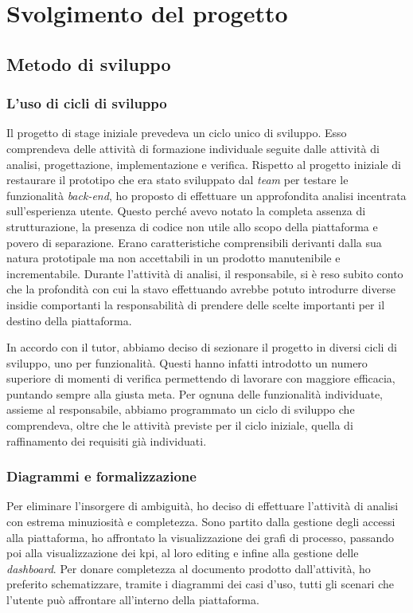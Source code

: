 
\chapter{Svolgimento del progetto}
\label{cap:modalita-svolgimento}
\section{Metodo di sviluppo}
\subsection{L'uso di cicli di sviluppo}
Il progetto di stage iniziale prevedeva un ciclo unico di sviluppo. Esso comprendeva delle attività di formazione individuale seguite dalle attività di analisi, progettazione, implementazione e verifica.
Rispetto al progetto iniziale di restaurare il prototipo che era stato sviluppato dal \textit{team} per testare le funzionalità \textit{back-end}, ho proposto di effettuare un approfondita analisi incentrata sull'esperienza utente. Questo perché avevo notato la completa assenza di strutturazione, la presenza di codice non utile allo scopo della piattaforma e povero di separazione. Erano caratteristiche comprensibili derivanti dalla sua natura prototipale ma non accettabili in un prodotto manutenibile e incrementabile.
Durante l'attività di analisi, il responsabile, si è reso subito conto che la profondità con cui la stavo effettuando avrebbe potuto introdurre diverse insidie comportanti la responsabilità di prendere delle scelte importanti per il destino della piattaforma.

In accordo con il tutor, abbiamo deciso di sezionare il progetto in diversi cicli di sviluppo, uno per funzionalità. Questi hanno infatti introdotto un numero superiore di momenti di verifica permettendo di lavorare con maggiore efficacia, puntando sempre alla giusta meta.
Per ognuna delle funzionalità individuate, assieme al responsabile, abbiamo programmato un ciclo di sviluppo che comprendeva, oltre che le attività previste per il ciclo iniziale, quella di raffinamento dei requisiti già individuati.

\subsection{Diagrammi e formalizzazione}
\label{ssec:diagrams}
Per eliminare l'insorgere di ambiguità, ho deciso di effettuare l'attività di analisi con estrema minuziosità e completezza.
Sono partito dalla gestione degli accessi alla piattaforma, ho affrontato la visualizzazione dei grafi di processo, passando poi alla visualizzazione dei \acrshort{kpi}, al loro editing e infine alla gestione delle \textit{dashboard}.
Per donare completezza al documento prodotto dall'attività, ho preferito schematizzare, tramite i diagrammi dei casi d'uso, tutti gli scenari che l'utente può affrontare all'interno della piattaforma.


